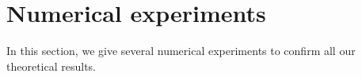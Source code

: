 \documentclass[a4paper]{amsart}
\begin{document}

\section{Numerical experiments}
In this section, we give several numerical experiments to confirm all our theoretical results. 
\end{document}
